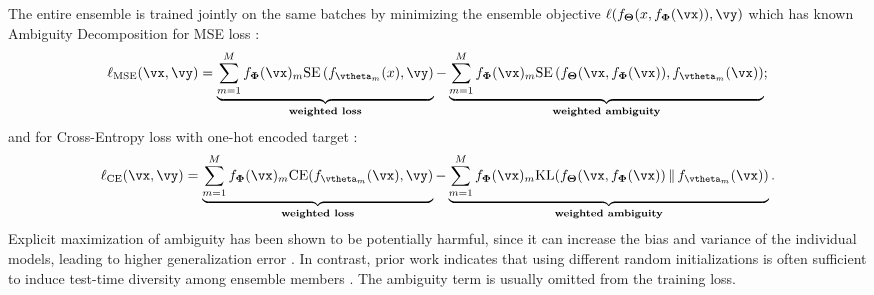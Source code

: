 \documentclass[10pt]{article} %
\def\vTheta{{\bm{\Theta}}}
\def\vPhi{{\bm{\Phi}}}
\begin{document}
The entire ensemble is trained jointly on the same batches by minimizing the ensemble objective $\ell(f_{\vTheta}(x, f_{\vPhi}(\vx)), \vy)$ which has known Ambiguity Decomposition for MSE loss \citep{NIPS1994_b8c37e33}:
\begin{equation} \label{eq:mse-train}
\ell_{\text{MSE}}(\vx, \vy)
=
\underbrace{
\sum_{m=1}^M f_{\vPhi}(\vx)_m
\mathrm{SE}\left(f_{\vtheta_m}(x), \vy\right)
}_{\textbf{weighted loss}}
-
\underbrace{
\sum_{m=1}^M f_{\vPhi}(\vx)_m
\mathrm{SE}\left(f_{\vTheta}(\vx, f_{\vPhi}(\vx)),  f_{\vtheta_m}(\vx)\right)
}_{\textbf{weighted ambiguity}};
\end{equation}
and for Cross-Entropy loss with one-hot encoded target \cite{wood2023unified}:
\begin{equation} \label{eq:ce-train}
\ell_{\text{CE}}(\vx, \vy)
=
\underbrace{
\sum_{m=1}^M f_{\vPhi}(\vx)_m
\mathrm{CE}\!\left(f_{\vtheta_m}(\vx), \vy\right)
}_{\textbf{weighted loss}}
-
\underbrace{
\sum_{m=1}^M f_{\vPhi}(\vx)_m \mathrm{KL}(f_{\vTheta}(\vx, f_{\vPhi}(\vx))  \,\|\, f_{\vtheta_m}(\vx))
}_{\textbf{weighted ambiguity}}.
\end{equation}
Explicit maximization of ambiguity has been shown to be potentially harmful, since it can increase the bias and variance of the individual models, leading to higher generalization error \citep{pmlr-v151-ortega22a, wood2023unified}. In contrast, prior work indicates that using different random initializations is often sufficient to induce test-time diversity among ensemble members \citep{fort2019deep, pmlr-v151-ortega22a}. The ambiguity term is usually omitted from the training loss.




\end{document}
